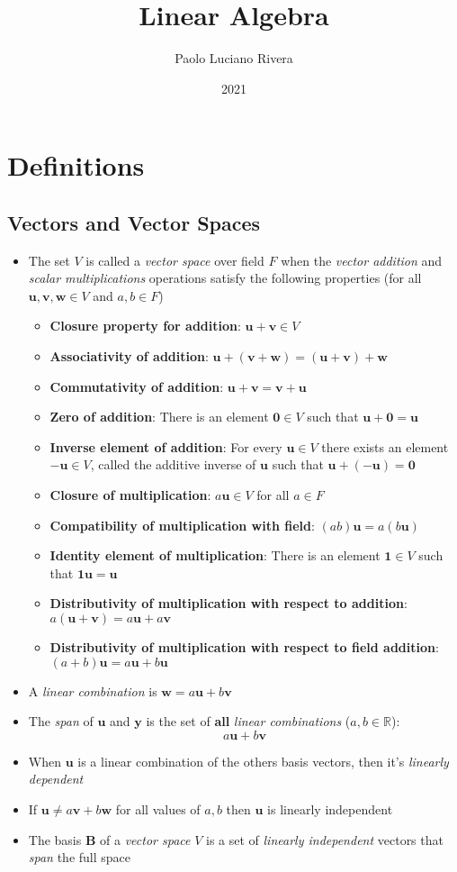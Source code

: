 \documentclass[pdftex,11pt,a4paper]{article}
\title{Linear Algebra}
\author{Paolo Luciano Rivera}
\date{2021}
\newcommand{\B}{\mathbf{B}}
\newcommand{\zero}{\mathbf{0}}
\newcommand{\one}{\mathbf{1}}
\newcommand{\yn}{\mathbf{y}}
\newcommand{\un}{\mathbf{u}}
\newcommand{\vn}{\mathbf{v}}
\newcommand{\wn}{\mathbf{w}}
\begin{document}
\maketitle

\section{Definitions}
\subsection{Vectors and Vector Spaces}
\begin{itemize}
	\item The set $V$ is called a \textit{vector space} over field $F$ when the \textit{vector addition} and \textit{scalar multiplications} operations satisfy the following properties (for all $\un, \vn, \wn \in V$ and $a, b \in F$)
	\begin{itemize}
		\item \textbf{Closure property for addition}: $\un + \vn \in V$
		\item \textbf{Associativity of addition}: $\un + (\vn + \wn) = (\un + \vn) + \wn$
		\item \textbf{Commutativity of addition}: $\un + \vn = \vn + \un$
		\item \textbf{Zero of addition}: There is an element $\zero \in V$ such that $\un + \zero = \un$
		\item \textbf{Inverse element of addition}: For every $\un \in V$ there exists an element $-\un \in V$, called the additive inverse of $\un$ such that $\un + (-\un) = \zero$
		\item \textbf{Closure of multiplication}: $a \un \in V$ for all $a \in F$
		\item \textbf{Compatibility of multiplication with field}: $(ab)\un = a(b\un)$
		\item \textbf{Identity element of multiplication}: There is an element $\one \in V$ such that $\one \un = \un$
		\item \textbf{Distributivity of multiplication with respect to addition}: $a(\un + \vn) = a\un + a\vn$
		\item \textbf{Distributivity of multiplication with respect to field addition}: $(a + b)\un = a\un + b\un$
	\end{itemize}
	
	\item A \textit{linear combination} is $\wn = a\un + b\vn$
	\item The \textit{span} of $\un$ and $\yn$ is the set of \textbf{all} \textit{linear combinations} ($a, b \in \mathbb{R}$):
	$$a \un + b \vn$$  
	\item When $\un$ is a linear combination of the others basis vectors, then it's \textit{linearly dependent}
	\item If $\un \neq a\vn + b \wn$ for all values of $a, b$ then $\un$ is linearly independent
 	\item The basis $\B$ of a \textit{vector space} $V$ is a set of \textit{linearly independent} vectors that \textit{span} the full space
\end{itemize}
\end{document}
